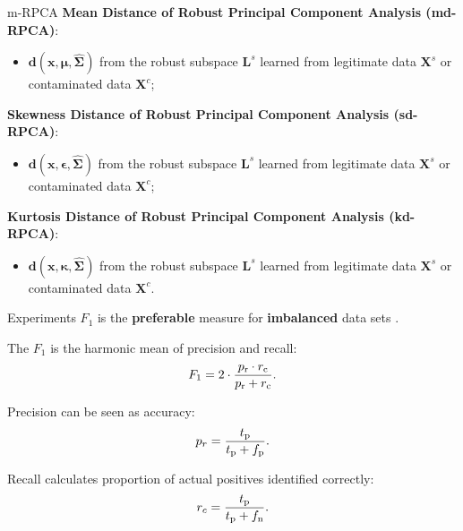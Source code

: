 \documentclass[newPxFont, numfooter, sectionpages]{beamer}
\begin{document}
\begin{frame}[c]{m-RPCA}
    \textbf{Mean Distance of Robust Principal Component Analysis (md-RPCA)}:
	\begin{itemize}
		\item $\pmb{d}(\pmb{x}, \pmb{\mu}, \hat{\pmb{\Sigma}})$ from the robust subspace $\pmb{L}^s$ learned from legitimate data $\pmb{X}^s$ or contaminated data $\pmb{X}^c$;
	\end{itemize}
	
	\textbf{Skewness Distance of Robust Principal Component Analysis (sd-RPCA)}:
	\begin{itemize}
		\item $\pmb{d}(\pmb{x}, \pmb{\epsilon}, \hat{\pmb{\Sigma}})$ from the robust subspace $\pmb{L}^s$ learned from legitimate data $\pmb{X}^s$ or contaminated data $\pmb{X}^c$;
	\end{itemize}
	
	\textbf{Kurtosis Distance of Robust Principal Component Analysis (kd-RPCA)}:
	\begin{itemize}
		\item $\pmb{d}(\pmb{x}, \pmb{\kappa}, \hat{\pmb{\Sigma}})$ from the robust subspace $\pmb{L}^s$ learned from legitimate data $\pmb{X}^s$ or contaminated data $\pmb{X}^c$.
	\end{itemize}
\end{frame}


\begin{frame}[c]{Experiments}
    \textbf{$F_1$} is the \textbf{preferable} measure for \textbf{imbalanced} data sets \cite{powers2011evaluation,moustafa2019holistic}.
    
    The $F_1$ is the harmonic mean of precision and recall:
    \begin{equation}\label{eq:4.15}
    	F_1 = 2 \cdot \frac{p_{\rm r} \cdot r_{\rm c}}{p_{\rm r} + r_{\rm c}}.
    \end{equation}

    Precision can be seen as accuracy:
    \begin{equation}\label{eq:4.16}
    	p_r = \frac{t_{\rm p}}{t_{\rm p} + f_{\rm p}}.
    \end{equation}

    Recall calculates proportion of actual positives identified correctly:
    \begin{equation}\label{eq:4.17}
    	r_c = \frac{t_{\rm p}}{t_{\rm p} + f_{\rm n}}.
    \end{equation}
\end{frame}
\end{document}
